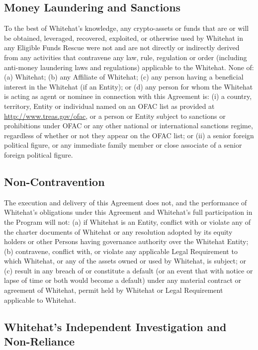 \documentclass{article}
\begin{document}
\subsection{Money Laundering and Sanctions}\label{subsec:money_laundering}

To the best of Whitehat's knowledge, any crypto-assets or funds that are or will be obtained, leveraged, recovered, exploited, or otherwise used by Whitehat in any Eligible Funds Rescue were not and are not directly or indirectly derived from any activities that contravene any law, rule, regulation or order (including anti-money laundering laws and regulations) applicable to the Whitehat. None of: (a) Whitehat; (b) any Affiliate of Whitehat; (c) any person having a beneficial interest in the Whitehat (if an Entity); or (d) any person for whom the Whitehat is acting as agent or nominee in connection with this Agreement is: (i) a country, territory, Entity or individual named on an OFAC list as provided at \url{http://www.treas.gov/ofac}, or a person or Entity subject to sanctions or prohibitions under OFAC or any other national or international sanctions regime, regardless of whether or not they appear on the OFAC list; or (ii) a senior foreign political figure, or any immediate family member or close associate of a senior foreign political figure.

\subsection{Non-Contravention}\label{subsec:non_contravention}

The execution and delivery of this Agreement does not, and the performance of Whitehat's obligations under this Agreement and Whitehat's full participation in the Program will not: (a) if Whitehat is an Entity, conflict with or violate any of the charter documents of Whitehat or any resolution adopted by its equity holders or other Persons having governance authority over the Whitehat Entity; (b) contravene, conflict with, or violate any applicable Legal Requirement to which Whitehat, or any of the assets owned or used by Whitehat, is subject; or (c) result in any breach of or constitute a default (or an event that with notice or lapse of time or both would become a default) under any material contract or agreement of Whitehat, permit held by Whitehat or Legal Requirement applicable to Whitehat.

\subsection{Whitehat's Independent Investigation and Non-Reliance}\label{subsec:independent_investigation}
\end{document}
